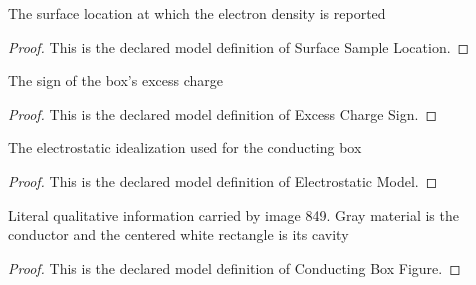 \begin{definition}
  \label{def:physics:phyx-mini-0849:phyxminiproblems-problemphyxmini0849-surfacesamplelocation}
  The surface location at which the electron density is reported
\end{definition}
\begin{proof}
  This is the declared model definition of Surface Sample Location.
\end{proof}
\begin{definition}
  \label{def:physics:phyx-mini-0849:phyxminiproblems-problemphyxmini0849-excesschargesign}
  The sign of the box's excess charge
\end{definition}
\begin{proof}
  This is the declared model definition of Excess Charge Sign.
\end{proof}
\begin{definition}
  \label{def:physics:phyx-mini-0849:phyxminiproblems-problemphyxmini0849-electrostaticmodel}
  The electrostatic idealization used for the conducting box
\end{definition}
\begin{proof}
  This is the declared model definition of Electrostatic Model.
\end{proof}
\begin{definition}
  \label{def:physics:phyx-mini-0849:phyxminiproblems-problemphyxmini0849-conductingboxfigure}
  Literal qualitative information carried by image 849. Gray material is the conductor and the centered white rectangle is its cavity
\end{definition}
\begin{proof}
  This is the declared model definition of Conducting Box Figure.
\end{proof}
